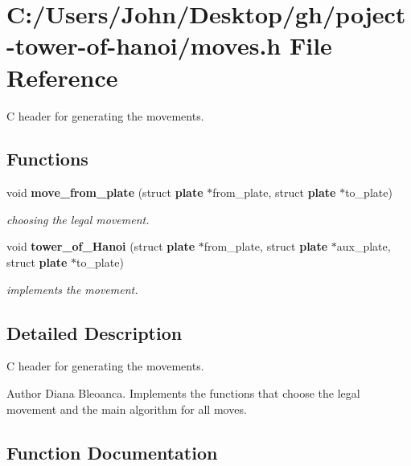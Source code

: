 \section{C\+:/\+Users/\+John/\+Desktop/gh/poject-\/tower-\/of-\/hanoi/moves.h File Reference}
\label{moves_8h}


C header for generating the movements.  


\subsection*{Functions}
\begin{DoxyCompactItemize}
\item 
void \textbf{ move\+\_\+from\+\_\+plate} (struct \textbf{ plate} $\ast$from\+\_\+plate, struct \textbf{ plate} $\ast$to\+\_\+plate)
\begin{DoxyCompactList}\small\item\em choosing the legal movement. \end{DoxyCompactList}\item 
void \textbf{ tower\+\_\+of\+\_\+\+Hanoi} (struct \textbf{ plate} $\ast$from\+\_\+plate, struct \textbf{ plate} $\ast$aux\+\_\+plate, struct \textbf{ plate} $\ast$to\+\_\+plate)
\begin{DoxyCompactList}\small\item\em implements the movement. \end{DoxyCompactList}\end{DoxyCompactItemize}


\subsection{Detailed Description}
C header for generating the movements. 

\begin{DoxyAuthor}{Author}
Diana Bleoanca. Implements the functions that choose the legal movement and the main algorithm for all moves. 
\end{DoxyAuthor}


\subsection{Function Documentation}
\mbox{\label{moves_8h_abd0635f086adec6cecc559bb47aa5097}} 
